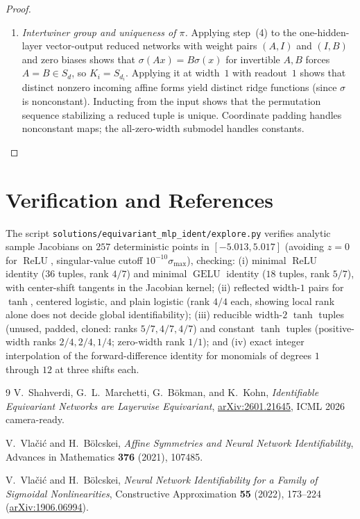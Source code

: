 \documentclass[11pt]{article}
\theoremstyle{plain}
\theoremstyle{definition}
\theoremstyle{remark}
\DeclareMathOperator{\GELU}{GELU}
\DeclareMathOperator{\ReLU}{ReLU}
\begin{document}
\begin{proof}
\begin{enumerate}[leftmargin=2em,label=\textup{(\arabic*)}]
\item \emph{Intertwiner group and uniqueness of $\pi$.} Applying step~(4) to the one-hidden-layer vector-output reduced networks with weight pairs $(A, I)$ and $(I, B)$ and zero biases shows that $\sigma(Ax) = B\sigma(x)$ for invertible $A, B$ forces $A = B \in S_d$, so $K_i = S_{d_i}$. Applying it at width~$1$ with readout~$1$ shows that distinct nonzero incoming affine forms yield distinct ridge functions (since $\sigma$ is nonconstant). Inducting from the input shows that the permutation sequence stabilizing a reduced tuple is unique. Coordinate padding handles nonconstant maps; the all-zero-width submodel handles constants. \qedhere
\end{enumerate}
\end{proof}

\section{Verification and References}

The script \texttt{solutions/equivariant\_mlp\_ident/explore.py} verifies analytic sample Jacobians on $257$ deterministic points in $[-5.013, 5.017]$ (avoiding $z = 0$ for $\ReLU$, singular-value cutoff $10^{-10}\sigma_{\max}$), checking:
(i) minimal $\ReLU$ identity ($36$ tuples, rank $4/7$) and minimal $\GELU$ identity ($18$ tuples, rank $5/7$), with center-shift tangents in the Jacobian kernel;
(ii) reflected width-$1$ pairs for $\tanh$, centered logistic, and plain logistic (rank $4/4$ each, showing local rank alone does not decide global identifiability);
(iii) reducible width-$2$ $\tanh$ tuples (unused, padded, cloned: ranks $5/7, 4/7, 4/7$) and constant $\tanh$ tuples (positive-width ranks $2/4, 2/4, 1/4$; zero-width rank $1/1$); and
(iv) exact integer interpolation of the forward-difference identity for monomials of degrees $1$ through $12$ at three shifts each.

\begin{thebibliography}{9}
V.~Shahverdi, G.~L.~Marchetti, G.~B\"okman, and K.~Kohn,
\emph{Identifiable Equivariant Networks are Layerwise Equivariant},
\href{https://arxiv.org/abs/2601.21645}{arXiv:2601.21645}, ICML 2026 camera-ready.

V.~Vla\v{c}i\'c and H.~B\"olcskei,
\emph{Affine Symmetries and Neural Network Identifiability},
Advances in Mathematics \textbf{376} (2021), 107485.

V.~Vla\v{c}i\'c and H.~B\"olcskei,
\emph{Neural Network Identifiability for a Family of Sigmoidal Nonlinearities},
Constructive Approximation \textbf{55} (2022), 173--224
(\href{https://arxiv.org/abs/1906.06994}{arXiv:1906.06994}).
\end{thebibliography}
\end{document}
